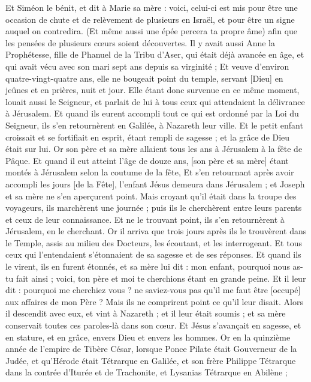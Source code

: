 \begin{multicols}{2}
Et Siméon le bénit, et dit à Marie sa mère : voici, celui-ci est mis pour être une occasion de chute et de relèvement de plusieurs en Israël, et pour être un signe auquel on contredira.
(Et même aussi une épée percera ta propre âme) afin que les pensées de plusieurs cœurs soient découvertes.
Il y avait aussi Anne la Prophétesse, fille de Phanuel de la Tribu d'Aser, qui était déjà avancée en âge, et qui avait vécu avec son mari sept ans depuis sa virginité ;
Et veuve d'environ quatre-vingt-quatre ans, elle ne bougeait point du temple, servant [Dieu] en jeûnes et en prières, nuit et jour.
Elle étant donc survenue en ce même moment, louait aussi le Seigneur, et parlait de lui à tous ceux qui attendaient la délivrance à Jérusalem.
Et quand ils eurent accompli tout ce qui est ordonné par la Loi du Seigneur, ils s'en retournèrent en Galilée, à Nazareth leur ville.
Et le petit enfant croissait et se fortifiait en esprit, étant rempli de sagesse ; et la grâce de Dieu était sur lui.
Or son père et sa mère allaient tous les ans à Jérusalem à la fête de Pâque.
Et quand il eut atteint l'âge de douze ans, [son père et sa mère] étant montés à Jérusalem selon la coutume de la fête,
Et s'en retournant après avoir accompli les jours [de la Fête], l'enfant Jésus demeura dans Jérusalem ; et Joseph et sa mère ne s'en aperçurent point.
Mais croyant qu'il était dans la troupe des voyageurs, ils marchèrent une journée ; puis ils le cherchèrent entre leurs parents et ceux de leur connaissance.
Et ne le trouvant point, ils s'en retournèrent à Jérusalem, en le cherchant.
Or il arriva que trois jours après ils le trouvèrent dans le Temple, assis au milieu des Docteurs, les écoutant, et les interrogeant.
Et tous ceux qui l'entendaient s'étonnaient de sa sagesse et de ses réponses.
Et quand ils le virent, ils en furent étonnés, et sa mère lui dit : mon enfant, pourquoi nous as-tu fait ainsi ; voici, ton père et moi te cherchions étant en grande peine.
Et il leur dit : pourquoi me cherchiez vous ? ne saviez-vous pas qu'il me faut être [occupé] aux affaires de mon Père ?
Mais ils ne comprirent point ce qu'il leur disait.
Alors il descendit avec eux, et vint à Nazareth ; et il leur était soumis ; et sa mère conservait toutes ces paroles-là dans son cœur.
Et Jésus s'avançait en sagesse, et en stature, et en grâce, envers Dieu et envers les hommes.
\VerseOne{}Or en la quinzième année de l'empire de Tibère César, lorsque Ponce Pilate était Gouverneur de la Judée, et qu'Hérode était Tétrarque en Galilée, et son frère Philippe Tétrarque dans la contrée d'Iturée et de Trachonite, et Lysanias Tétrarque en Abilène ;

\end{multicols}
